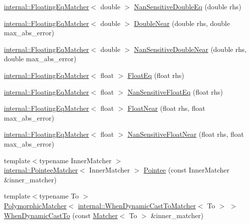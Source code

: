 \begin{DoxyCompactItemize}
\hyperlink{classtesting_1_1internal_1_1FloatingEqMatcher}{internal\+::\+Floating\+Eq\+Matcher}$<$ double $>$ \hyperlink{namespacetesting_aa83ee35256fd90033f615ef640245525}{Nan\+Sensitive\+Double\+Eq} (double rhs)
\item 
\hyperlink{classtesting_1_1internal_1_1FloatingEqMatcher}{internal\+::\+Floating\+Eq\+Matcher}$<$ double $>$ \hyperlink{namespacetesting_aaee08ecb6815ef8398bbcb4e56d56d44}{Double\+Near} (double rhs, double max\+\_\+abs\+\_\+error)
\item 
\hyperlink{classtesting_1_1internal_1_1FloatingEqMatcher}{internal\+::\+Floating\+Eq\+Matcher}$<$ double $>$ \hyperlink{namespacetesting_a3caa8177ef48150d0dde3a54b0961f7f}{Nan\+Sensitive\+Double\+Near} (double rhs, double max\+\_\+abs\+\_\+error)
\item 
\hyperlink{classtesting_1_1internal_1_1FloatingEqMatcher}{internal\+::\+Floating\+Eq\+Matcher}$<$ float $>$ \hyperlink{namespacetesting_ac75507edb7998957b48fb17a9b8a020b}{Float\+Eq} (float rhs)
\item 
\hyperlink{classtesting_1_1internal_1_1FloatingEqMatcher}{internal\+::\+Floating\+Eq\+Matcher}$<$ float $>$ \hyperlink{namespacetesting_ab3653439a654b85bdccff46d1436670d}{Nan\+Sensitive\+Float\+Eq} (float rhs)
\item 
\hyperlink{classtesting_1_1internal_1_1FloatingEqMatcher}{internal\+::\+Floating\+Eq\+Matcher}$<$ float $>$ \hyperlink{namespacetesting_a933a78452dd1770669bed758f35ff250}{Float\+Near} (float rhs, float max\+\_\+abs\+\_\+error)
\item 
\hyperlink{classtesting_1_1internal_1_1FloatingEqMatcher}{internal\+::\+Floating\+Eq\+Matcher}$<$ float $>$ \hyperlink{namespacetesting_a347ebf0075ca9470e71e8ac468c9818f}{Nan\+Sensitive\+Float\+Near} (float rhs, float max\+\_\+abs\+\_\+error)
\item 
{\footnotesize template$<$typename Inner\+Matcher $>$ }\\\hyperlink{classtesting_1_1internal_1_1PointeeMatcher}{internal\+::\+Pointee\+Matcher}$<$ Inner\+Matcher $>$ \hyperlink{namespacetesting_a5122ca3533f3a00f67e146dd81f3b68c}{Pointee} (const Inner\+Matcher \&inner\+\_\+matcher)
\item 
{\footnotesize template$<$typename To $>$ }\\\hyperlink{classtesting_1_1PolymorphicMatcher}{Polymorphic\+Matcher}$<$ \hyperlink{classtesting_1_1internal_1_1WhenDynamicCastToMatcher}{internal\+::\+When\+Dynamic\+Cast\+To\+Matcher}$<$ To $>$ $>$ \hyperlink{namespacetesting_aabfc320cc132d0a1da2a255b45a17b7a}{When\+Dynamic\+Cast\+To} (const \hyperlink{classtesting_1_1Matcher}{Matcher}$<$ To $>$ \&inner\+\_\+matcher)

\end{DoxyCompactItemize}
